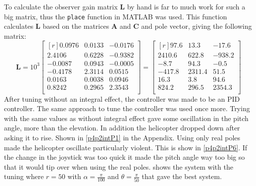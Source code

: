 To calculate the observer gain matrix \textbf{L} by hand is far to much work for such a big matrix, thus the \texttt{place} function in MATLAB was used. This function calculates \textbf{L} based on the matrices \textbf{A} and \textbf{C} and pole vector, giving the following matrix:
\[
    \textbf{L} = 10^3 \begin{bmatrix*}[r]
        0.0976 & 0.0133 & -0.0176\\
        2.4106 & 0.6228 & -0.9382\\
        -0.0087 & 0.0943 & -0.0005\\
        -0.4178 & 2.3114 & 0.0515\\
        0.0163 & 0.0038 & 0.0946\\
        0.8242 & 0.2965 & 2.3543\\
    \end{bmatrix*}
    = 
    \begin{bmatrix*}[r] 
        97.6 & 13.3 & -17.6\\
        2410.6 & 622.8 & -938.2\\
        -8.7 & 94.3 & -0.5\\
        -417.8 & 2311.4 & 51.5\\
        16.3 & 3.8 & 94.6\\
        824.2 & 296.5 & 2354.3\\
    \end{bmatrix*}
\]
After tuning without an integral effect, the controller was made to be an PID controller. The same approach to tune the controller was used once more. Trying with the same values as without integral effect gave some oscillation in the pitch angle, more than the elevation. In addition the helicopter dropped down after asking it to rise. Shown in \cref{p4p2intP1} in the Appendix. Using only real poles made the helicopter oscillate particularly violent. This is show in \cref{p4p2intP6}. If the change in the joystick was too quick it made the pitch angle way too big so that it would tip over when using the real poles.  shows the system with the tuning where $r = 50$ with $\alpha = \frac{\pi}{100}$ and $\theta = \frac{\pi}{50}$ that gave the best system.


